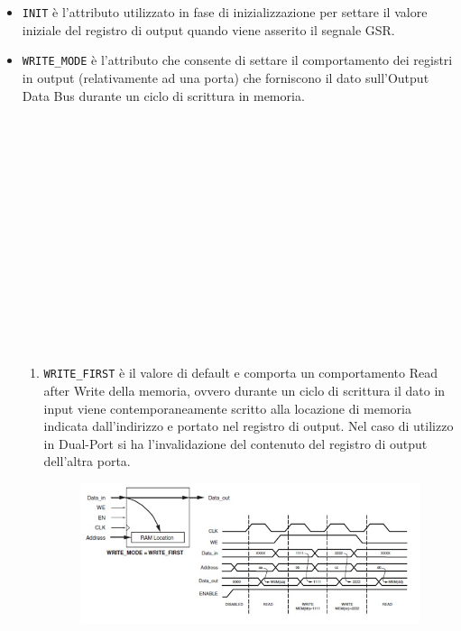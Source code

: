 \begin{itemize}
INITP\_xx sono attributi analoghi che consentono di inizializzare i bit di parit \`a presenti in memoria (da INITP\_00 a INITP\_07).
\item \texttt{INIT}  \`e l'attributo utilizzato in fase di inizializzazione per settare il valore iniziale del registro di output quando viene asserito il segnale GSR.
\\
\item \texttt{WRITE\_MODE}  \`e l'attributo che consente di settare il comportamento dei registri in output (relativamente ad una porta) che forniscono il dato sull'Output Data Bus durante un ciclo di scrittura in memoria.\\\\\\\\\\\\\\\\\\\\\\\\\\\\\\

\begin{enumerate}
\item \texttt{WRITE\_FIRST} \`e  il valore di default e comporta un comportamento Read after Write della memoria, ovvero durante un ciclo di scrittura il dato in input viene contemporaneamente scritto alla locazione di memoria indicata dall'indirizzo e portato nel registro di output. 
Nel caso di utilizzo in Dual-Port si ha l'invalidazione del contenuto del registro di output dell'altra porta.

\begin{figure}[!h]
\centering
\includegraphics[width=\textwidth]{img/blockRam/writeFirst.jpg}
\label{fig:set_ass}
\end{figure}


\end{enumerate}
\end{itemize}
